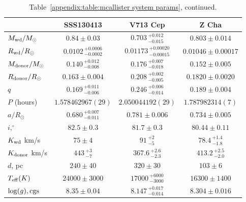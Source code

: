 \begin{landscape}
    \begin{table}
        \caption{Table~\ref{appendix:table:mcallister system params}, continued.}
        \label{appendix:table:mcallister system params cont 2}
        \begin{tabular}{lccc}
        \hline
        ~                               & \textbf{SSS130413}                & \textbf{V713 Cep}                 & \textbf{Z Cha}            \\
        \hline
        \hline
        $M_{\rm wd}/M_{\odot}$          & $0.84\pm0.03$                     & $0.703\,^{+0.012}_{-0.015}$       & $0.803\pm0.014$           \\
        $R_{\rm wd}/R_{\odot}$          & $0.0102\,^{+0.0006}_{-0.0002}$    & $0.01173\,^{+0.00020}_{-0.00015}$ & $0.01046\pm0.00017$       \\
        $M_{\rm donor}/M_{\odot}$       & $0.140\,^{+0.012}_{-0.008}$       & $0.176\,^{+0.007}_{-0.018}$       & $0.152\pm0.005$           \\
        $R_{\rm donor}/R_{\odot}$       & $0.163\pm0.004$                   & $0.208\,^{+0.002}_{-0.005}$       & $0.1820\pm0.0020$         \\
        $q$                             & $0.169\,^{+0.011}_{-0.006}$       & $0.246\,^{+0.006}_{-0.014}$       & $0.189\pm0.004$           \\
        \hline
        $P$ (hours)                      & $1.578462967(29)$                 & $2.050044192(29)$                 & $1.787982314(7)$          \\
        $a/R_{\odot}$                   & $0.680\,^{+0.007}_{-0.011}$       & $0.781\pm0.006$                   & $0.734\pm0.005$           \\
        $i, ^\circ$                     & $82.5\pm0.3$                      & $81.7\pm0.3$                      & $80.44\pm0.11$            \\
        $K_{\rm wd}$ km/s               & $75\pm4$                          & $91\,^{+2}_{-5}$                  & $78.4\,^{+1.4}_{-1.8}$    \\
        $K_{\rm donor}$ km/s            & $443\,^{+3}_{-7}$                 & $367.6\,^{+2.6}_{-2.3}$           & $413.2\,^{+2.5}_{-2.0}$   \\
        \hline
        $d$, pc                         & $240\pm40$                        & $320\pm30$                        & $103\pm6$                 \\
        $T_{\rm eff} (K)$               & $24000\pm3000$                    & $17000\,^{+6000}_{-3000}$         & $16300\pm1400$            \\
        $\log(g), {\rm cgs}$            & $8.35\pm0.04$                     & $8.147\,^{+0.017}_{-0.014}$       & $8.304\pm0.016$           \\
        \hline
        \hline
        \end{tabular}
        \end{table}



\end{landscape}

